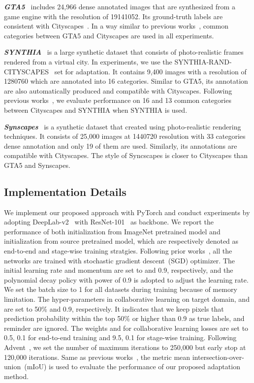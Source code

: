 \documentclass[final]{cvpr}
\begin{document}
\textbf{\textit{GTA5}}~\cite{Richter_2016_ECCV} includes 24,966 dense annotated images that are synthesized from a game engine with the resolution of 19141052. Its ground-truth labels are consistent with Cityscapes~\cite{cordts2016cityscapes}. In a way similar to previous works~\cite{li2019bidirectional, vu2019advent}, common categories between GTA5 and Cityscapes are used in all experiments. 

\textbf{\textit{SYNTHIA}}~\cite{Ros_2016_CVPR} is a large synthetic dataset that consists of photo-realistic frames rendered from a virtual city. In experiments, we use the SYNTHIA-RAND-CITYSCAPES~\cite{Ros_2016_CVPR} set for adaptation. It contains 9,400 images with a resolution of 1280760 which are annotated into 16 categories. Similar to GTA5, its annotation are also automatically produced and compatible with Cityscapes. Following previous works~\cite{FDA_Yang_2020_CVPR, tsai2018learning, vu2019advent}, we evaluate performance on 16 and 13 common categories between Cityscapes and SYNTHIA when SYNTHIA is used.

\textbf{\textit{Synscapes}}~\cite{wrenninge2018synscapes} is a synthetic dataset that created using photo-realistic rendering techniques. It consists of 25,000 images at 1440720 resolution with 33 categories dense annotation and only 19 of them are used. Similarly, its annotations are compatible with Cityscapes. The style of Syncscapes is closer to Cityscapes than GTA5 and Synscapes.




\subsection{Implementation Details}
We implement our proposed approach with PyTorch and conduct experiments by adopting DeepLab-v2~\cite{chen2017deeplab} with ResNet-101~\cite{he2016deep} as backbone. We report the performance of both initialization from ImageNet pretrained model and initialization from source pretrained model, which are respectively denoted as end-to-end and stage-wise training stratgies. Following prior works~\cite{FDA_Yang_2020_CVPR,vu2019advent,tsai2018learning}, all the networks are trained with stochastic gradient descent~(SGD) optimizer. The initial learning rate and momentum are set to  and 0.9, respectively, and the polynomial decay policy with power of 0.9 is adopted to adjust the learning rate. We set the batch size to 1 for all datasets during training because of memory limitation. The hyper-parameters in collaborative learning on target domain,  and  are set to 50\% and 0.9, respectively. It indicates that we keep pixels that prediction probability within the top 50\% or higher than 0.9 as true labels, and reminder are ignored. The weights  and  for collaborative learning losses are set to 0.5, 0.1 for end-to-end training and 9.5, 0.1 for stage-wise training. Following Advent~\cite{vu2019advent}, we set the number of maximum iterations to 250,000 but early stop at 120,000 iterations. Same as previous works~\cite{FDA_Yang_2020_CVPR,vu2019advent,tsai2018learning,pan2020unsupervised}, the metric mean intersection-over-union~(mIoU) is used to evaluate the performance of our proposed adaptation method.
\end{document}
